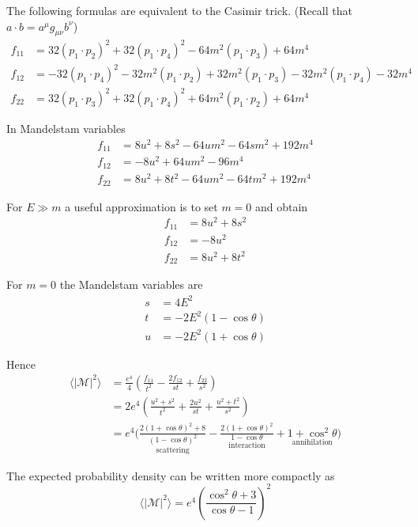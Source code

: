 The following formulas are equivalent to the Casimir trick.
(Recall that $a\cdot b=a^\mu g_{\mu\nu}b^\nu$)
\begin{align*}
f_{11}&=
32(p_1\cdot p_2)^2
+32(p_1\cdot p_4)^2
-64 m^2(p_1\cdot p_3)
+64 m^4
\\
f_{12}&=
-32 (p_1\cdot p_4)^2
-32 m^2 (p_1\cdot p_2)
+32 m^2 (p_1\cdot p_3)
-32 m^2 (p_1\cdot p_4)
-32 m^4
\\
f_{22}&=
32(p_1\cdot p_3)^2
+32(p_1\cdot p_4)^2
+64 m^2(p_1\cdot p_2)
+64 m^4
\end{align*}

In Mandelstam variables
\begin{align*}
f_{11} &= 8 u^2 + 8 s^2 - 64 u m^2 - 64 s m^2 + 192 m^4
\\
f_{12} &= -8 u^2 + 64 u m^2 - 96 m^4
\\
f_{22} &= 8 u^2 + 8 t^2 - 64 u m^2 - 64 t m^2 + 192 m^4
\end{align*}

For $E\gg m$ a useful approximation is to set $m=0$ and obtain
\begin{align*}
f_{11}&=8u^2+8s^2
\\
f_{12}&=-8u^2
\\
f_{22}&=8u^2+8t^2
\end{align*}

For $m=0$ the Mandelstam variables are
\begin{align*}
s&=4E^2
\\
t&=-2E^2(1-\cos\theta)
\\
u&=-2E^2(1+\cos\theta)
\end{align*}

Hence
\begin{align*}
\langle|\mathcal{M}|^2\rangle
&=\frac{e^4}{4}
\left(\frac{f_{11}}{t^2}-\frac{2f_{12}}{st}+\frac{f_{22}}{s^2}\right)
\\
&=2e^4\left(\frac{u^2+s^2}{t^2}+\frac{2u^2}{st}+\frac{u^2+t^2}{s^2}\right)
\\
&=e^4\biggl(
\underset{\text{scattering}}
{\frac{2(1+\cos\theta)^2+8}{(1-\cos\theta)^2}}
-\underset{\text{interaction}}
{\frac{2(1+\cos\theta)^2}{1-\cos\theta}}
+\underset{\text{annihilation}}
{1+\cos^2\theta}
\biggr)
\end{align*}

The expected probability density can be written more compactly as
\begin{equation*}
\langle|\mathcal{M}|^2\rangle=e^4\left(\frac{\cos^2\theta+3}{\cos\theta-1}\right)^2
\end{equation*}

